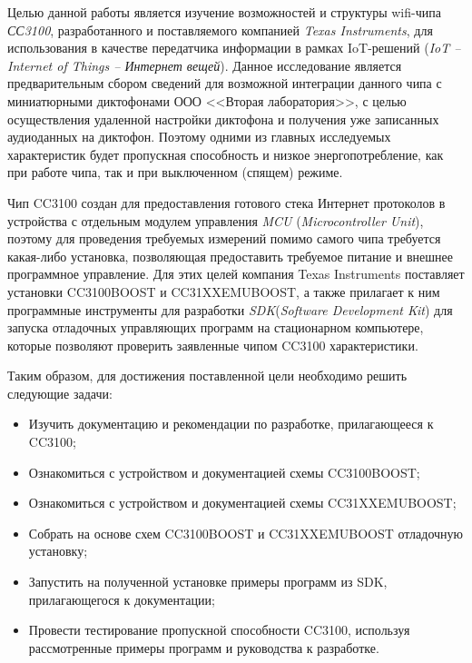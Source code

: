 \Introduction

Целью данной работы является изучение возможностей и
структуры wifi-чипа \textit{СС3100}\cite{cc3100}, разработанного и
поставляемого компанией \textit{Texas Instruments}, для использования
в качестве передатчика информации в рамках IoT-решений
(\textit{IoT -- Internet of Things -- Интернет вещей}).
Данное исследование является предварительным сбором сведений
для возможной интеграции данного чипа с миниатюрными диктофонами
ООО <<Вторая лаборатория>>\cite{labi2dicts}, с целью
осуществления удаленной настройки диктофона и получения
уже записанных аудиоданных на диктофон. Поэтому одними
из главных исследуемых характеристик будет пропускная способность
и низкое энергопотребление, как при работе чипа, так и при
выключенном (спящем) режиме.

Чип CC3100 создан для предоставления готового стека
Интернет протоколов в устройства с отдельным модулем управления
\textit{MCU} (\textit{Microcontroller Unit}), поэтому для
проведения требуемых измерений помимо самого чипа
требуется какая-либо установка, позволяющая предоставить
требуемое питание и внешнее программное управление.
Для этих целей компания Texas Instruments поставляет
установки CC3100BOOST\cite{cc3100boost} и CC31XXEMUBOOST\cite{cc31xxemuboost},
а также прилагает к ним программные инструменты для разработки
\textit{SDK}(\textit{Software Development Kit}) для запуска
отладочных управляющих программ на стационарном компьютере,
которые позволяют проверить заявленные чипом CC3100 характеристики.

\clearpage
Таким образом, для достижения поставленной цели необходимо решить следующие задачи:

\begin{itemize}
\item Изучить документацию и рекомендации по разработке, прилагающееся к CC3100;
\item Ознакомиться с устройством и документацией схемы CC3100BOOST;
\item Ознакомиться с устройством и документацией схемы CC31XXEMUBOOST;
\item Собрать на основе схем CC3100BOOST и CC31XXEMUBOOST отладочную установку;
\item Запустить на полученной установке примеры программ из SDK, прилагающегося к документации;
\item Провести тестирование пропускной способности CC3100, используя рассмотренные примеры
программ и руководства к разработке.
\end{itemize}

